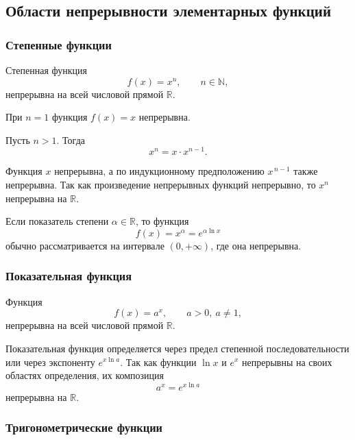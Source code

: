 \subsection{Области непрерывности элементарных функций}

\subsubsection{Степенные функции}

\begin{theorem}
Степенная функция
\[
f(x)=x^n, \qquad n\in\mathbb{N},
\]
непрерывна на всей числовой прямой $\mathbb{R}$.
\end{theorem}

\begin{Proof}
При $n=1$ функция $f(x)=x$ непрерывна.

Пусть $n>1$. Тогда
\[
x^n=x\cdot x^{n-1}.
\]

Функция $x$ непрерывна, а по индукционному предположению
$x^{\,n-1}$ также непрерывна. Так как произведение непрерывных
функций непрерывно, то $x^n$ непрерывна на $\mathbb{R}$.
\end{Proof}

\begin{remark}
Если показатель степени $\alpha\in\mathbb{R}$, то функция
\[
f(x)=x^\alpha = e^{\alpha \ln x}
\]
обычно рассматривается на интервале $(0,+\infty)$,
где она непрерывна.
\end{remark}

\subsubsection{Показательная функция}

\begin{theorem}
Функция
\[
f(x)=a^x, \qquad a>0,\ a\neq1,
\]
непрерывна на всей числовой прямой $\mathbb{R}$.
\end{theorem}

\begin{Proof}
Показательная функция определяется через предел степенной
последовательности или через экспоненту $e^{x\ln a}$.
Так как функции $\ln x$ и $e^x$ непрерывны на своих областях
определения, их композиция
\[
a^x=e^{x\ln a}
\]
непрерывна на $\mathbb{R}$.
\end{Proof}

\subsubsection{Тригонометрические функции}

